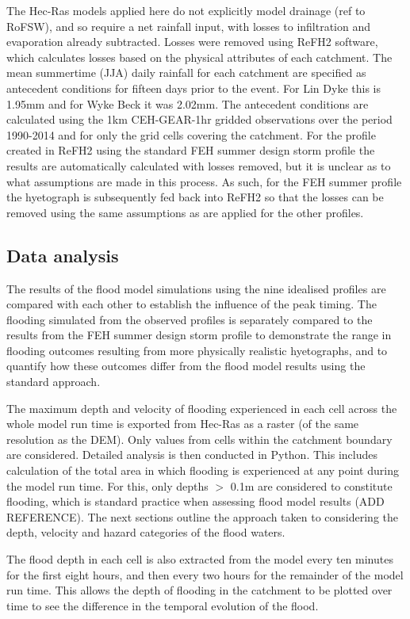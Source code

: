 \documentclass[APA,Times2COL]{WileyNJDv5}
\begin{document}
The Hec-Ras models applied here do not explicitly model drainage (ref to RoFSW), and so require a net rainfall input, with losses to infiltration and evaporation already subtracted. Losses were removed using ReFH2 software, which calculates losses based on the physical attributes of each catchment. The mean summertime (JJA) daily rainfall for each catchment are specified as antecedent conditions for fifteen days prior to the event. For Lin Dyke this is 1.95mm and for Wyke Beck it was 2.02mm. The antecedent conditions are calculated using the 1km CEH-GEAR-1hr gridded observations \citep{lewis2019gridded} over the period 1990-2014 and for only the grid cells covering the catchment. For the profile created in ReFH2 using the standard FEH summer design storm profile the results are automatically calculated with losses removed, but it is unclear as to what assumptions are made in this process. As such, for the FEH summer profile the hyetograph is subsequently fed back into ReFH2 so that the losses can be removed using the same assumptions as are applied for the other profiles. 

\subsection{Data analysis}\label{subsec:model:data_analysis}
The results of the flood model simulations using the nine idealised profiles are compared with each other to establish the influence of the peak timing. The flooding simulated from the observed profiles is separately compared to the results from the FEH summer design storm profile to demonstrate the range in flooding outcomes resulting from more physically realistic hyetographs, and to quantify how these outcomes differ from the flood model results using the standard approach. 

The maximum depth and velocity of flooding experienced in each cell across the whole model run time is exported from Hec-Ras as a raster (of the same resolution as the DEM). Only values from cells within the catchment boundary are considered. Detailed analysis is then conducted in Python. This includes calculation of the total area in which flooding is experienced at any point during the model run time. For this, only depths $>$ 0.1m are considered to constitute flooding, which is standard practice when assessing flood model results (ADD REFERENCE). The next sections outline the approach taken to considering the depth, velocity and hazard categories of the flood waters.

The flood depth in each cell is also extracted from the model every ten minutes for the first eight hours, and then every two hours for the remainder of the model run time. This allows the depth of flooding in the catchment to be plotted over time to see the difference in the temporal evolution of the flood.  
\end{document}
